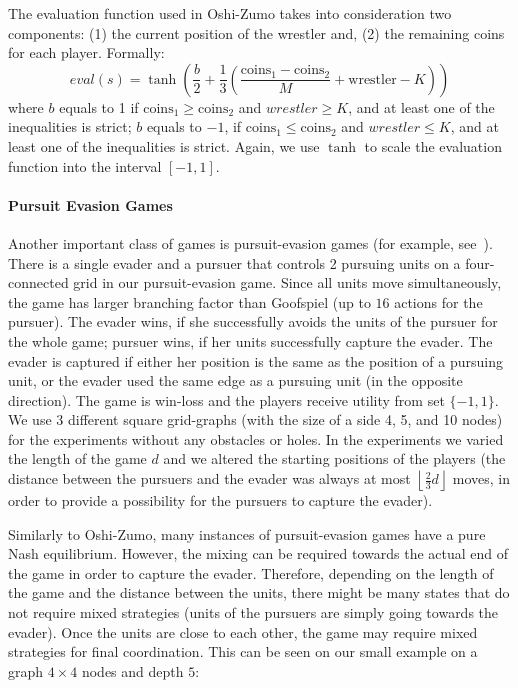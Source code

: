 \vspace{0.1cm}

The evaluation function used in Oshi-Zumo takes into consideration two components: (1) the current position of the wrestler and, (2) the remaining coins for each player. Formally:
$$
eval(s) = \tanh\left(\frac{b}{2}+\frac{1}{3}\left(\frac{\textrm{coins}_1 - \textrm{coins}_2}{M} + \textrm{wrestler} - K\right)\right)
$$
where $b$ equals to 1 if $\textrm{coins}_1 \geq \textrm{coins}_2$ and $wrestler \geq K$, and at least one of the inequalities is strict;
$b$ equals to $-1$, if $\textrm{coins}_1 \leq \textrm{coins}_2$ and $wrestler \leq K$, and at least one of the inequalities is strict.
Again, we use $\tanh$ to scale the evaluation function into the interval $[-1,1]$.

\paragraph{\textbf{Pursuit Evasion Games}}

Another important class of games is pursuit-evasion games (for example, see~\cite{nguyen2013monte}).
There is a single evader and a pursuer that controls 2 pursuing units on a four-connected grid in our pursuit-evasion game. 
Since all units move simultaneously, the game has larger branching factor than Goofspiel (up to $16$ actions for the pursuer).
The evader wins, if she successfully avoids the units of the pursuer for the whole game; pursuer wins, if her units successfully capture the evader. The evader is captured if either her position is the same as the position of a pursuing unit, or the evader used the same edge as a pursuing unit (in the opposite direction). 
The game is win-loss and the players receive utility from set $\lbrace -1, 1 \rbrace$.
We use $3$ different square grid-graphs (with the size of a side 4, 5, and 10 nodes) for the experiments without any obstacles or holes.
In the experiments we varied the length of the game $d$ and we altered the starting positions of the players (the distance between the pursuers and the evader was always at most $\left\lfloor\frac{2}{3} d\right\rfloor$ moves, in order to provide a possibility for the pursuers to capture the evader).

Similarly to Oshi-Zumo, many instances of pursuit-evasion games have a pure Nash equilibrium.
However, the mixing can be required towards the actual end of the game in order to capture the evader.
Therefore, depending on the length of the game and the distance between the units, there might be many states that do not require mixed strategies (units of the pursuers are simply going towards the evader).
Once the units are close to each other, the game may require mixed strategies for final coordination. 
This can be seen on our small example on a graph $4\times4$ nodes and depth $5$:

